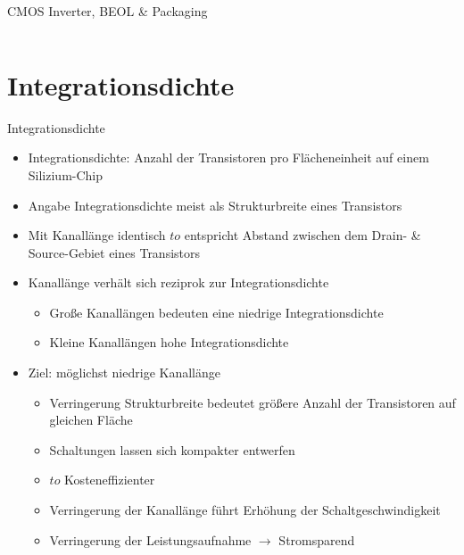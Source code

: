 \documentclass[12pt%
,aspectratio=169%
]{beamer}
\begin{document}
\begin{frame}{CMOS Inverter, BEOL \& Packaging}
\begin{columns}[T]
\begin{column}{.38\textwidth}
\end{column}%
\end{columns}
\end{frame}

\section{Integrationsdichte}

\begin{frame}{Integrationsdichte}
\begin{itemize}
	\item Integrationsdichte: Anzahl der Transistoren pro Flächeneinheit auf einem Silizium-Chip
	\item Angabe Integrationsdichte meist als Strukturbreite eines Transistors
	\item Mit Kanallänge identisch $to$ entspricht Abstand zwischen dem Drain- \& Source-Gebiet eines Transistors
	\item Kanallänge verhält sich reziprok zur Integrationsdichte
	\begin{itemize}
		\item Große Kanallängen bedeuten eine niedrige Integrationsdichte
		\item Kleine Kanallängen hohe Integrationsdichte
	\end{itemize}
	\item Ziel: möglichst niedrige Kanallänge
	\begin{itemize}
		\item Verringerung Strukturbreite bedeutet größere Anzahl der Transistoren auf gleichen Fläche
		\item Schaltungen lassen sich kompakter entwerfen
		\item $to$ Kosteneffizienter
		\item Verringerung der Kanallänge führt Erhöhung der Schaltgeschwindigkeit
		\item Verringerung der Leistungsaufnahme $\to$ Stromsparend
	\end{itemize}
\end{itemize}
\end{frame}
\end{document}
